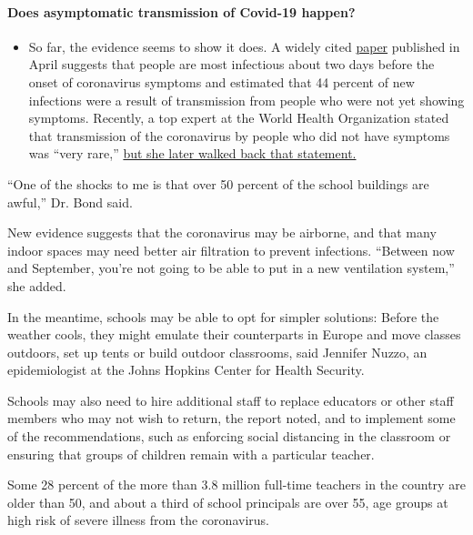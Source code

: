 \begin{itemize}
{  \paragraph{Does asymptomatic transmission of Covid-19
  happen?}\label{does-asymptomatic-transmission-of-covid-19-happen}}

  \begin{itemize}
  \tightlist
  \item
    So far, the evidence seems to show it does. A widely cited
    \href{https://www.nature.com/articles/s41591-020-0869-5}{paper}
    published in April suggests that people are most infectious about
    two days before the onset of coronavirus symptoms and estimated that
    44 percent of new infections were a result of transmission from
    people who were not yet showing symptoms. Recently, a top expert at
    the World Health Organization stated that transmission of the
    coronavirus by people who did not have symptoms was ``very rare,''
    \href{https://www.nytimes.com/2020/06/09/world/coronavirus-updates.html?action=click\&pgtype=Article\&state=default\&region=MAIN_CONTENT_3\&context=storylines_faq\#link-1f302e21}{but
    she later walked back that statement.}
  \end{itemize}
\end{itemize}

``One of the shocks to me is that over 50 percent of the school
buildings are awful,'' Dr. Bond said.

New evidence suggests that the coronavirus may be airborne, and that
many indoor spaces may need better air filtration to prevent infections.
``Between now and September, you're not going to be able to put in a new
ventilation system,'' she added.

In the meantime, schools may be able to opt for simpler solutions:
Before the weather cools, they might emulate their counterparts in
Europe and move classes outdoors, set up tents or build outdoor
classrooms, said Jennifer Nuzzo, an epidemiologist at the Johns Hopkins
Center for Health Security.

Schools may also need to hire additional staff to replace educators or
other staff members who may not wish to return, the report noted, and to
implement some of the recommendations, such as enforcing social
distancing in the classroom or ensuring that groups of children remain
with a particular teacher.

Some 28 percent of the more than 3.8 million full-time teachers in the
country are older than 50, and about a third of school principals are
over 55, age groups at high risk of severe illness from the coronavirus.

